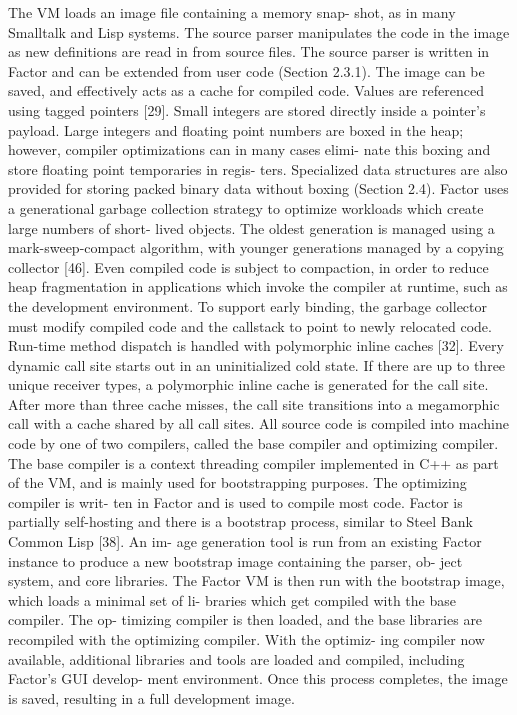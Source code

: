 The VM loads an image ﬁle containing a memory snap- shot, as in many Smalltalk
and Lisp systems. The source parser manipulates the code in the image as new
deﬁnitions are read in from source ﬁles. The source parser is written in Factor
and can be extended from user code (Section 2.3.1).  The image can be saved,
and effectively acts as a cache for compiled code.  Values are referenced using
tagged pointers [29]. Small integers are stored directly inside a pointer’s
payload. Large integers and ﬂoating point numbers are boxed in the heap;
however, compiler optimizations can in many cases elimi- nate this boxing and
store ﬂoating point temporaries in regis- ters. Specialized data structures are
also provided for storing packed binary data without boxing (Section 2.4).
Factor uses a generational garbage collection strategy to optimize workloads
which create large numbers of short- lived objects. The oldest generation is
managed using a mark-sweep-compact algorithm, with younger generations managed
by a copying collector [46]. Even compiled code is subject to compaction, in
order to reduce heap fragmentation in applications which invoke the compiler at
runtime, such as the development environment. To support early binding, the
garbage collector must modify compiled code and the callstack to point to newly
relocated code.  Run-time method dispatch is handled with polymorphic inline
caches [32]. Every dynamic call site starts out in an uninitialized cold state.
If there are up to three unique receiver types, a polymorphic inline cache is
generated for the call site. After more than three cache misses, the call site
transitions into a megamorphic call with a cache shared by all call sites.  All
source code is compiled into machine code by one of two compilers, called the
base compiler and optimizing compiler. The base compiler is a context threading
compiler implemented in C++ as part of the VM, and is mainly used for
bootstrapping purposes. The optimizing compiler is writ- ten in Factor and is
used to compile most code.  Factor is partially self-hosting and there is a
bootstrap process, similar to Steel Bank Common Lisp [38]. An im- age
generation tool is run from an existing Factor instance to produce a new
bootstrap image containing the parser, ob- ject system, and core libraries. The
Factor VM is then run with the bootstrap image, which loads a minimal set of
li- braries which get compiled with the base compiler. The op- timizing
compiler is then loaded, and the base libraries are recompiled with the
optimizing compiler. With the optimiz- ing compiler now available, additional
libraries and tools are loaded and compiled, including Factor’s GUI develop-
ment environment. Once this process completes, the image is saved, resulting in
a full development image.

